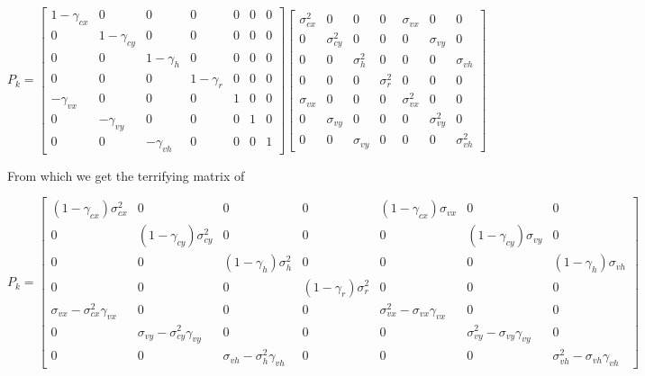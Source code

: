 \documentclass[10pt]{article}
\begin{document}
    \begin{equation*}
        P_k = \begin{bmatrix}
            1 - \gamma_{cx} & 0 & 0 & 0 & 0 & 0 & 0 \\
            0 & 1 - \gamma_{cy} & 0 & 0 & 0 & 0 & 0 \\
            0 & 0 & 1 - \gamma_h & 0 & 0 & 0 & 0 \\
            0 & 0 & 0 & 1 - \gamma_r & 0 & 0 & 0 \\
            -\gamma_{vx} & 0 & 0 & 0 & 1 & 0 & 0 \\
            0 & -\gamma_{vy} & 0 & 0 & 0 & 1 & 0 \\
            0 & 0 & -\gamma_{vh} & 0 & 0 & 0 & 1
        \end{bmatrix}
        \begin{bmatrix}
            \sigma^2_{cx} & 0 & 0 & 0 & \sigma_{vx} & 0 & 0 \\
            0 & \sigma^2_{cy} & 0 & 0 & 0 & \sigma_{vy} & 0 \\
            0 & 0 & \sigma^2_h & 0 & 0 & 0 & \sigma_{vh} \\
            0 & 0 & 0 & \sigma^2_r & 0 & 0 & 0 \\
            \sigma_{vx} & 0 & 0 & 0 & \sigma^2_{vx} & 0 & 0 \\
            0 & \sigma_{vy} & 0 & 0 & 0 & \sigma^2_{vy} & 0 \\
            0 & 0 & \sigma_{vy} & 0 & 0 & 0 & \sigma^2_{vh} 
        \end{bmatrix}
    \end{equation*}
    
    \noindent From which we get the terrifying matrix of

    \[
        P_k = \begin{bmatrix}
            (1 - \gamma_{cx})\sigma^2_{cx} & 0 & 0 & 0 & (1 - \gamma_{cx})\sigma_{vx} & 0 & 0 \\
            0 & (1 - \gamma_{cy})\sigma^2_{cy} & 0 & 0 & 0 & (1 - \gamma_{cy})\sigma_{vy} & 0 \\
            0 & 0 & (1 - \gamma_h)\sigma^2_h & 0 & 0 & 0 & (1 - \gamma_h)\sigma_{vh} \\
            0 & 0 & 0 & (1 - \gamma_r)\sigma^2_r & 0 & 0 & 0 \\
            \sigma_{vx} - \sigma^2_{cx}\gamma_{vx} & 0 & 0 & 0 & \sigma^2_{vx} - \sigma_{vx}\gamma_{vx} & 0 & 0 \\
            0 & \sigma_{vy} - \sigma^2_{cy}\gamma_{vy} & 0 & 0 & 0 & \sigma^2_{vy} - \sigma_{vy}\gamma_{vy} & 0 \\
            0 & 0 & \sigma_{vh} - \sigma^2_h\gamma_{vh} & 0 & 0 & 0 & \sigma^2_{vh} - \sigma_{vh}\gamma_{vh}
        \end{bmatrix}
    \]
\end{document}
